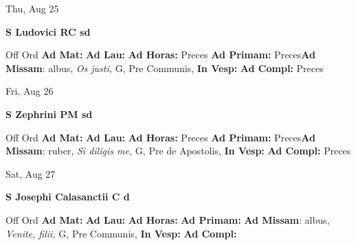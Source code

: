 \documentclass[10pt]{memoir}
\begin{document}
\begin{center}
\begin{minipage}{3.5in}
\vspace{2em}
\begin{center}Thu, Aug 25
\end{center}
\textbf{ \large S Ludovici RC
\textnormal{\normalsize sd}}

\begin{justify}Off Ord
\textbf{Ad Mat: }
\textbf{Ad Lau: }
\textbf{Ad Horas: }Preces
\textbf{Ad Primam: }Preces\textbf{Ad Missam}: albus, \textit{Os justi,} G, Pre Communis, 
\textbf{In Vesp: }
\textbf{Ad Compl: }Preces
\end{justify}
\end{minipage}
\end{center}

\begin{center}
\begin{minipage}{3.5in}
\vspace{2em}
\begin{center}Fri, Aug 26
\end{center}
\textbf{ \large S Zephrini PM
\textnormal{\normalsize sd}}

\begin{justify}Off Ord
\textbf{Ad Mat: }
\textbf{Ad Lau: }
\textbf{Ad Horas: }Preces
\textbf{Ad Primam: }Preces\textbf{Ad Missam}: ruber, \textit{Si diligis me,} G, Pre de Apostolis, 
\textbf{In Vesp: }
\textbf{Ad Compl: }Preces
\end{justify}
\end{minipage}
\end{center}

\begin{center}
\begin{minipage}{3.5in}
\vspace{2em}
\begin{center}Sat, Aug 27
\end{center}
\textbf{ \large S Josephi Calasanctii C
\textnormal{\normalsize d}}

\begin{justify}Off Ord
\textbf{Ad Mat: }
\textbf{Ad Lau: }
\textbf{Ad Horas: }
\textbf{Ad Primam: }\textbf{Ad Missam}: albus, \textit{Venite, filii,} G, Pre Communis, 
\textbf{In Vesp: }
\textbf{Ad Compl: }
\end{justify}
\end{minipage}
\end{center}
\end{document}
